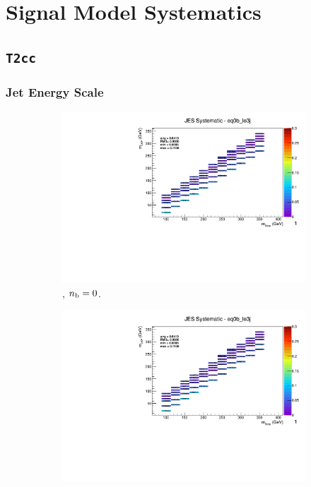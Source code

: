 \chapter{Signal Model Systematics}
\label{ch:app_sig_syst}

\section*{\texttt{T2cc}}
\label{sec:t2cc_syst_plots}

\newpage
\subsection*{Jet Energy Scale}
\label{sec:t2cc_jes_plots}

\begin{figure}[ht!]
  \centering
  \begin{subfigure}[b]{0.32\textwidth}
    \includegraphics[width=\textwidth, page=12]{Figs/sms/t2cc/v37_2/systs/T2cc_JES_eq0b_le3j.pdf}
    \caption{\njlow, $n_{\text{b}} = 0$.}
  \end{subfigure}
  \begin{subfigure}[b]{0.32\textwidth}
    \includegraphics[width=\textwidth, page=8]{Figs/sms/t2cc/v37_2/systs/T2cc_JES_eq0b_le3j.pdf}

\end{subfigure}
\end{figure}

